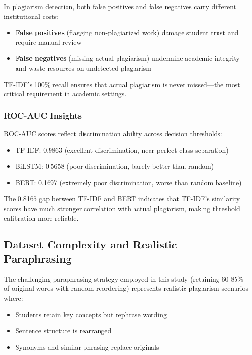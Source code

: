 In plagiarism detection, both false positives and false negatives carry different institutional costs:
\begin{itemize}
  \item \textbf{False positives} (flagging non-plagiarized work) damage student trust and require manual review
  \item \textbf{False negatives} (missing actual plagiarism) undermine academic integrity and waste resources on undetected plagiarism
\end{itemize}

TF-IDF's 100\% recall ensures that actual plagiarism is never missed—the most critical requirement in academic settings.

\subsubsection{ROC-AUC Insights}

ROC-AUC scores reflect discrimination ability across decision thresholds:
\begin{itemize}
  \item TF-IDF: 0.9863 (excellent discrimination, near-perfect class separation)
  \item BiLSTM: 0.5658 (poor discrimination, barely better than random)
  \item BERT: 0.1697 (extremely poor discrimination, worse than random baseline)
\end{itemize}

The 0.8166 gap between TF-IDF and BERT indicates that TF-IDF's similarity scores have much stronger correlation with actual plagiarism, making threshold calibration more reliable.

\subsection{Dataset Complexity and Realistic Paraphrasing}

The challenging paraphrasing strategy employed in this study (retaining 60-85\% of original words with random reordering) represents realistic plagiarism scenarios where:
\begin{itemize}
  \item Students retain key concepts but rephrase wording
  \item Sentence structure is rearranged
  \item Synonyms and similar phrasing replace originals
\end{itemize}

